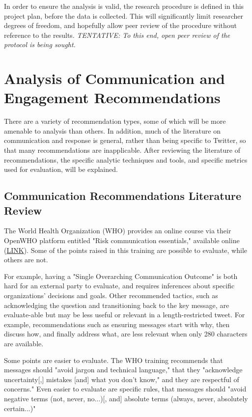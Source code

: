 \documentclass{article}
\begin{document}
In order to ensure the analysis is valid, the research procedure is defined in this project plan, before the data is collected. This will significantly limit researcher degrees of freedom, and hopefully allow peer review of the procedure without reference to the results. \textit{TENTATIVE: To this end, open peer review of the protocol is being sought.}

\section{Analysis of Communication and Engagement Recommendations}

There are a variety of recommendation types, some of which will be more amenable to analysis than others. In addition, much of the literature on communication and response is general, rather than being specific to Twitter, so that many recommendations are inapplicable. After reviewing the literature of recommendations, the specific analytic techniques and tools, and specific metrics used for evaluation, will be explained.

\subsection{Communication Recommendations Literature Review}
The World Health Organization (WHO) provides an online course via their OpenWHO platform entitled "Risk communication essentials," available online (\href{https://openwho.org/courses/risk-communication}{LINK})\cite{OpenWHORiskComm2017}. Some of the points raised in this training are possible to evaluate, while others are not. 
 
For example, having a "Single Overarching Communication Outcome" is both hard for an external party to evaluate, and requires inferences about specific organizations' decisions and goals. Other recommended tactics, such as acknowledging the question and transitioning back to the key message, are evaluate-able but may be less useful or relevant in a length-restricted tweet. For example, recommendations such as ensuring messages start with why, then discuss how, and finally address what, are less relevant when only 280 characters are available.

Some points are easier to evaluate. The WHO training recommends that messages should "avoid jargon and technical language," that they "acknowledge uncertainty[,] mistakes [and] what you don't know," and they are respectful of concerns." Even easier to evaluate are specific rules, that messages should "avoid negative terms (not, never, no...)[, and] absolute terms (always, never, absolutely certain...)"
\end{document}
